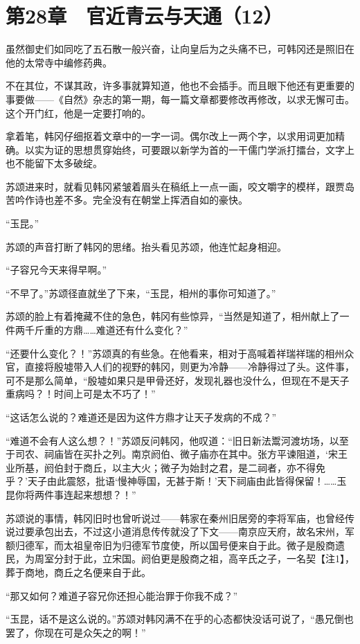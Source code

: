 \section{第28章　官近青云与天通（12）}

虽然御史们如同吃了五石散一般兴奋，让向皇后为之头痛不已，可韩冈还是照旧在他的太常寺中编修药典。

不在其位，不谋其政，许多事就算知道，他也不会插手。而且眼下他还有更重要的事要做——《自然》杂志的第一期，每一篇文章都要修改再修改，以求无懈可击。这个开门红，他是一定要打响的。

拿着笔，韩冈仔细抠着文章中的一字一词。偶尔改上一两个字，以求用词更加精确。以实为证的思想贯穿始终，可要跟以新学为首的一干儒门学派打擂台，文字上也不能留下太多破绽。

苏颂进来时，就看见韩冈紧皱着眉头在稿纸上一点一画，咬文嚼字的模样，跟贾岛苦吟作诗也差不多。完全没有在朝堂上挥洒自如的豪快。

“玉昆。”

苏颂的声音打断了韩冈的思绪。抬头看见苏颂，他连忙起身相迎。

“子容兄今天来得早啊。”

“不早了。”苏颂径直就坐了下来，“玉昆，相州的事你可知道了。”

苏颂的脸上有着掩藏不住的急色，韩冈有些惊异，“当然是知道了，相州献上了一件两千斤重的方鼎……难道还有什么变化？”

“还要什么变化？！”苏颂真的有些急。在他看来，相对于高喊着祥瑞祥瑞的相州众官，直接将殷墟带入人们的视野的韩冈，则更为冷静——冷静得过了头。这件事，可不是那么简单，“殷墟如果只是甲骨还好，发现礼器也没什么，但现在不是天子重病吗？！时间上可是太不巧了！”

“这话怎么说的？难道还是因为这件方鼎才让天子发病的不成？”

“难道不会有人这么想？！”苏颂反问韩冈，他叹道：“旧日新法鬻河渡坊场，以至于司农、祠庙皆在买扑之列。南京阏伯、微子庙亦在其中。张方平谏阻道，‘宋王业所基，阏伯封于商丘，以主大火；微子为始封之君，是二祠者，亦不得免乎？’天子由此震怒，批语‘慢神辱国，无甚于斯！’天下祠庙由此皆得保留！……玉昆你将两件事连起来想想？！”

苏颂说的事情，韩冈旧时也曾听说过——韩家在秦州旧居旁的李将军庙，也曾经传说过要承包出去，不过这小道消息传传就没了下文——南京应天府，故名宋州，军额归德军，而太祖皇帝旧为归德军节度使，所以国号便来自于此。微子是殷商遗民，为周室分封于此，立宋国。阏伯更是殷商之祖，高辛氏之子，一名契【注1】，葬于商地，商丘之名便来自于此。

“那又如何？难道子容兄你还担心能治罪于你我不成？”

“玉昆，话不是这么说的。”苏颂对韩冈满不在乎的心态都快没话可说了，“愚兄倒也罢了，你现在可是众矢之的啊！”

